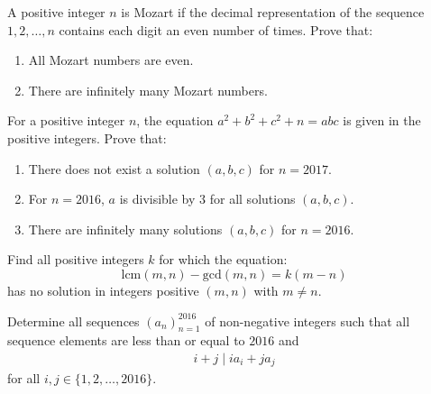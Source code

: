 \begin{problem}
	A positive integer $n$ is Mozart if the decimal representation of the sequence $1, 2, \ldots, n$ contains each digit an even number of times.
	Prove that:
	\begin{enumerate}
		\item All Mozart numbers are even.
		\item There are infinitely many Mozart numbers.
	\end{enumerate}
\end{problem}

\begin{problem}
	For a positive integer $n$, the equation $a^2 + b^2 + c^2 + n = abc$ is given in the positive integers.
	Prove that:
	\begin{enumerate}
		\item There does not exist a solution $(a, b, c)$ for $n = 2017$.
		\item For $n = 2016$, $a$ is divisible by $3$ for all solutions $(a, b, c)$.
		\item There are infinitely many solutions $(a, b, c)$ for $n = 2016$.
	\end{enumerate}
\end{problem}

\begin{problem}
	Find all positive integers $k$ for which the equation: $$ \text{lcm}(m,n)-\text{gcd}(m,n)=k(m-n)$$has no solution in integers positive $(m,n)$ with $m\neq n$. %
\end{problem}

\begin{problem}
	Determine all sequences $(a_n)_{n=1}^{2016}$ of non-negative integers such that all sequence elements are less than or equal to $2016$ and
	\begin{align*}
		i+j \mid ia_i + ja_j
	\end{align*}
	for all $i,j \in \{1, 2, \dots, 2016\}$.
\end{problem}

